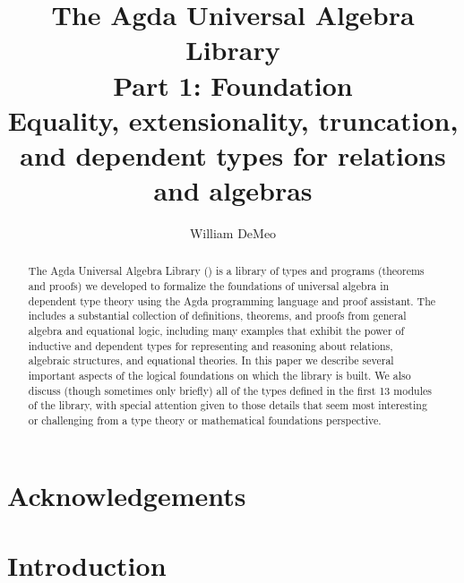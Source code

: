 \documentclass[a4paper,UKenglish,cleveref,autoref,thm-restate,12pt]{../lipics-v2021-wjd}
\title{The Agda Universal Algebra Library\\%
Part 1: Foundation\\[-5pt]
{\large Equality, extensionality, truncation, and dependent types for relations and algebras} }%
\author{William DeMeo}
       {Department of Algebra, Charles University in Prague \and \url{https://williamdemeo.gitlab.io}}
       {williamdemeo@gmail.com}{https://orcid.org/0000-0003-1832-5690}{}
\begin{document}
\maketitle


\begin{abstract}
The Agda Universal Algebra Library (\ualib) is a library of types and programs (theorems and proofs) we developed to formalize the foundations of universal algebra in dependent type theory using the Agda programming language and proof assistant. The \ualib includes a substantial collection of definitions, theorems, and proofs from general algebra and equational logic, including many examples that exhibit the power of inductive and dependent types for representing and reasoning about relations, algebraic structures, and equational theories. In this paper we describe several important aspects of the logical foundations on which the library is built. We also discuss (though sometimes only briefly) all of the types defined in the first 13 modules of the library, with special attention given to those details that seem most interesting or challenging from a type theory or mathematical foundations perspective.
\end{abstract}

\section*{Acknowledgements}


\newpage %

\setcounter{tocdepth}{2}
\tableofcontents


\section{Introduction}\label{sec:introduction}







\end{document}
